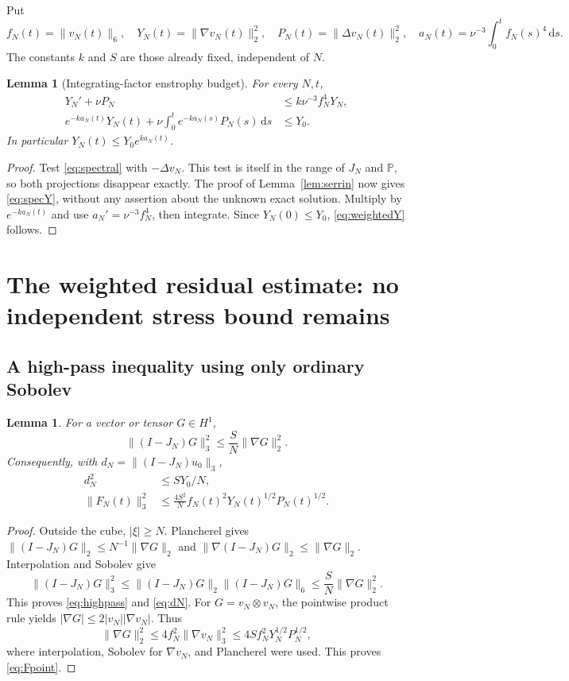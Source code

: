\documentclass[11pt,a4paper]{article}
\newtheorem{lemma}[theorem]{Lemma}
\theoremstyle{definition}\newtheorem{definition}[theorem]{Definition}
\theoremstyle{remark}\newtheorem{remark}[theorem]{Remark}
\newcommand{\PP}{\mathbb P}
\newcommand{\dd}{\,\mathrm d}
\newcommand{\norm}[1]{\lVert #1\rVert}
\numberwithin{equation}{section}
\begin{document}
Put
\begin{equation}\label{eq:specnotation}
 f_N(t)=\norm{v_N(t)}_6,\quad
 Y_N(t)=\norm{\nabla v_N(t)}_2^2,\quad
 P_N(t)=\norm{\Delta v_N(t)}_2^2,\quad
 a_N(t)=\nu^{-3}\int_0^tf_N(s)^4\dd s.
\end{equation}
The constants $k$ and $S$ are those already fixed, independent of $N$.
\begin{lemma}[Integrating-factor enstrophy budget]\label{lem:weightedY}
For every $N,t$,
\begin{align}
 Y_N'+\nu P_N&\le k\nu^{-3}f_N^4Y_N,\label{eq:specY}\\
 e^{-ka_N(t)}Y_N(t)+\nu\int_0^t e^{-ka_N(s)}P_N(s)\dd s&\le Y_0.\label{eq:weightedY}
\end{align}
In particular $Y_N(t)\le Y_0e^{ka_N(t)}$.
\end{lemma}
\begin{proof}
Test \eqref{eq:spectral} with $-\Delta v_N$. This test is itself in the range of $J_N$ and $\PP$, so both projections disappear exactly. The proof of Lemma~\ref{lem:serrin} now gives \eqref{eq:specY}, without any assertion about the unknown exact solution. Multiply by $e^{-ka_N(t)}$ and use $a_N'=\nu^{-3}f_N^4$, then integrate. Since $Y_N(0)\le Y_0$, \eqref{eq:weightedY} follows.
\end{proof}

\section{The weighted residual estimate: no independent stress bound remains}
\label{sec:weightedresidual}
\subsection{A high-pass inequality using only ordinary Sobolev}
\begin{lemma}\label{lem:highpass}
For a vector or tensor $G\in H^1$,
\begin{equation}\label{eq:highpass}
 \norm{(I-J_N)G}_3^2\le\frac SN\norm{\nabla G}_2^2.
\end{equation}
Consequently, with $d_N=\norm{(I-J_N)u_0}_3$,
\begin{align}
 d_N^2&\le S Y_0/N,\label{eq:dN}\\
 \norm{F_N(t)}_3^2&\le\frac{4S^2}{N} f_N(t)^2Y_N(t)^{1/2}P_N(t)^{1/2}.
 \label{eq:Fpoint}
\end{align}
\end{lemma}
\begin{proof}
Outside the cube, $|\xi|\ge N$. Plancherel gives $\norm{(I-J_N)G}_2\le N^{-1}\norm{\nabla G}_2$ and $\norm{\nabla(I-J_N)G}_2\le\norm{\nabla G}_2$. Interpolation and Sobolev give
\[
 \norm{(I-J_N)G}_3^2
 \le\norm{(I-J_N)G}_2\norm{(I-J_N)G}_6
 \le\frac SN\norm{\nabla G}_2^2.
\]
This proves \eqref{eq:highpass} and \eqref{eq:dN}. For $G=v_N\otimes v_N$, the pointwise product rule yields $|\nabla G|\le2|v_N||\nabla v_N|$. Thus
\[
 \norm{\nabla G}_2^2\le4f_N^2\norm{\nabla v_N}_3^2
 \le4S f_N^2Y_N^{1/2}P_N^{1/2},
\]
where interpolation, Sobolev for $\nabla v_N$, and Plancherel were used. This proves \eqref{eq:Fpoint}.
\end{proof}
\end{document}
